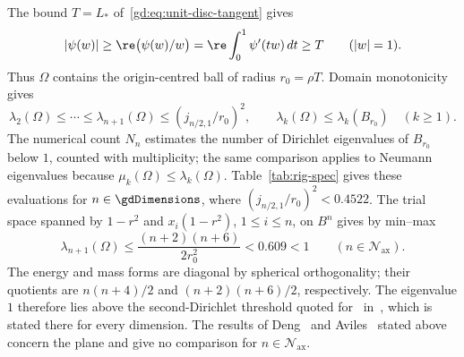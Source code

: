 The bound $T=L_*$ of~\eqref{gd:eq:unit-disc-tangent} gives
\[
 |\psi(w)|\ge\re\bigl(\psi(w)/w\bigr)
 =\re\int_0^1\psi'(tw)\,dt\ge T\qquad(|w|=1).
\]
Thus $\Omega$ contains the origin-centred ball of radius $r_0=\rho T$. Domain monotonicity gives
\[
 \lambda_2(\Omega)\le\cdots\le\lambda_{n+1}(\Omega)
 \le(j_{n/2,1}/r_0)^2,\qquad
 \lambda_k(\Omega)\le\lambda_k(B_{r_0})\quad(k\ge1).
\] The numerical count $N_n$ estimates the number of Dirichlet eigenvalues of $B_{r_0}$ below $1$, counted with multiplicity; the same comparison applies to Neumann eigenvalues because $\mu_k(\Omega)\leq\lambda_k(\Omega)$. Table~\ref{tab:rig-spec} gives these evaluations for
$n\in\gdRigDimensions$, where $(j_{n/2,1}/r_0)^2<0.4522$. The trial space spanned by $1-r^2$ and $x_i(1-r^2)$, $1\le i\le n$,
on $B^n$ gives by min--max
\[
 \lambda_{n+1}(\Omega)\le\frac{(n+2)(n+6)}{2r_0^2}<0.609<1\qquad(n\in\mathcal N_{\mathrm{ax}}).
\]
The energy and mass forms are diagonal by spherical orthogonality;
their quotients are $n(n+4)/2$ and $(n+2)(n+6)/2$, respectively. The eigenvalue $1$ therefore lies above the second-Dirichlet threshold quoted for~\cite{DLS26} in~\cite[\S1]{DSWZ25}, which is stated there for every dimension. The results of Deng~\cite{Den12} and Aviles~\cite{Avi86} stated above concern the plane and give no comparison for $n\in\mathcal N_{\mathrm{ax}}$.

